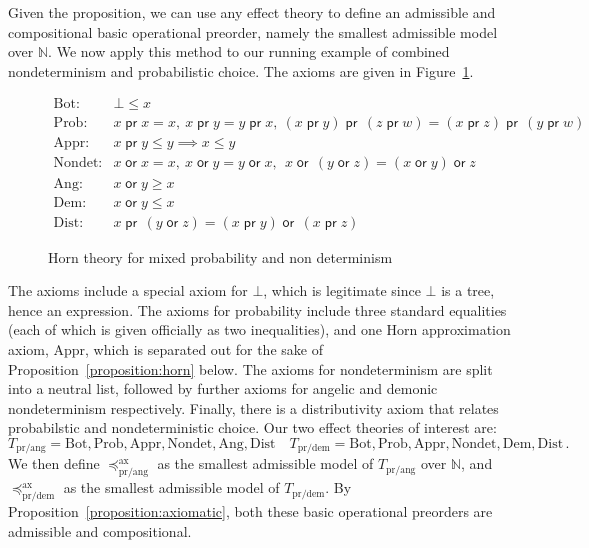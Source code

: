 \documentclass[a4paper,UKenglish]{lipics-v2018}
\newcommand{\Basicleq}{\preccurlyeq}
\newcommand{\prEff}{\operatorname{\textsf{pr}}}
\newcommand{\orEff}{\operatorname{\textsf{or}}}
\newcommand{\prang}{\text{pr/ang}}
\newcommand{\prdem}{\text{pr/dem}}
\newcommand{\Ax}{\text{ax}}
\theoremstyle{plain}
\begin{document}
Given the proposition, we can use any effect theory to define an admissible and compositional basic operational preorder, namely the smallest admissible model over $\mathbb{N}$. We now apply this method to our running example of combined nondeterminism and probabilistic choice. The  axioms are given in
Figure~\ref{fig:axiomsmixed}.
\begin{figure}[t]
\[
\begin{array}{ll}
\text{Bot:} & \bot \leq x
\\
\text{Prob:} & x \prEff x = x , ~ x \prEff y = y \prEff x , ~ 
                                (x \prEff y) \prEff\, (z \prEff w) = (x \prEff z) \prEff\, (y \prEff w)
\\
\text{Appr:} & x \prEff y \leq y \implies  x \leq y
 \\
\text{Nondet:} & x \orEff x = x, ~ x \orEff y = y \orEff x, ~ ~ x \orEff\, (y \orEff z) = (x \orEff y) \orEff z
\\
\text{Ang:} & x \orEff y \geq x \\ 
\text{Dem:} & x \orEff y \leq x \\ 
\text{Dist:} & x \prEff\, (y \orEff z) = (x \prEff y) \orEff\, (x \prEff z)
\end{array}
\]
    \caption{Horn theory for mixed probability and non determinism}
    \label{fig:axiomsmixed}
\end{figure}

The axioms include a special axiom for $\bot$, which is legitimate since $\bot$ is a tree, hence an expression.
The axioms  for probability include three standard equalities (each of which is given officially as two inequalities), and one Horn approximation axiom, $\text{Appr}$, which  is separated out for the sake of Proposition~\ref{proposition:horn} below.
The axioms for nondeterminism are split into a neutral list,  followed by further axioms  for angelic and demonic nondeterminism respectively. Finally, there is a distributivity axiom that relates
probabilstic and nondeterministic choice. 
Our two effect theories of interest are: 
\[
T_\prang \!=\!  \text{Bot},  \text{Prob},  \text{Appr}, \text{Nondet}, \text{Ang},\text{Dist} \quad
T_\prdem\! = \!\text{Bot},  \text{Prob},  \text{Appr},  \text{Nondet},  \text{Dem},\text{Dist}\,.
\]
We then define  $\Basicleq^\Ax_\prang$ as the smallest admissible model
of $T_\prang$ over $\mathbb{N}$, and 
$\Basicleq^\Ax_\prdem$ as the smallest admissible model
of $T_\prdem$. By Proposition~\ref{proposition:axiomatic}, both these basic operational preorders are admissible and compositional.
\end{document}
